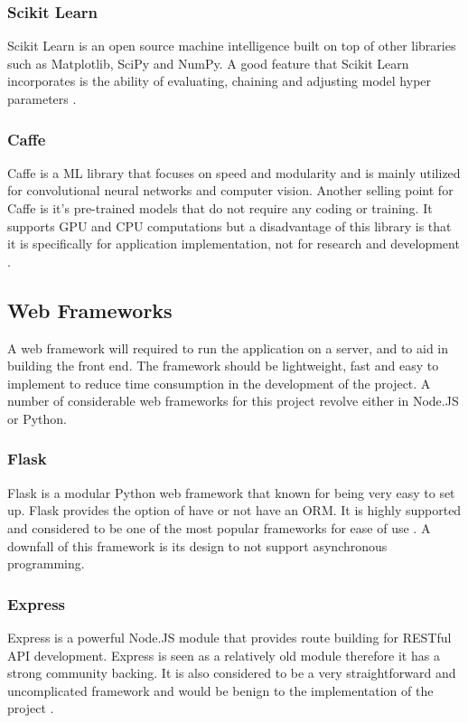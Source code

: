 \subsubsection{Scikit Learn}
Scikit Learn is an open source machine intelligence built on top of other libraries such as Matplotlib, SciPy and NumPy. A good feature that Scikit Learn incorporates is the ability of evaluating, chaining and adjusting model hyper parameters \citep{jain_2017}.
\subsubsection{Caffe}
Caffe is a ML library that focuses on speed and modularity and is mainly utilized for convolutional neural networks and computer vision. Another selling point for Caffe is it's pre-trained models that do not require any coding or training. It supports GPU and CPU computations but a disadvantage of this library is that it is specifically for application implementation, not for research and development \citep{koshy_2017}. 


\subsection*{Web Frameworks}
A web framework will required to run the application on a server, and to aid in building the front end. The framework should be lightweight, fast and easy to implement to reduce time consumption in the development of the project. A number of considerable web frameworks for this project revolve either in Node.JS or Python. 
\subsubsection{Flask}
Flask is a modular Python web framework that known for being very easy to set up. Flask provides the option of have or not have an ORM. It is highly supported and considered to be one of the most popular frameworks for ease of use \citep{slant}. 
A downfall of this framework is its design to not support asynchronous programming.
\subsubsection{Express}
Express is a powerful Node.JS module that provides route building for RESTful API development. Express is seen as a relatively old module therefore it has a strong community backing. It is also considered to be a very straightforward and uncomplicated framework and would be benign to the implementation of the project \citep{slant}.

